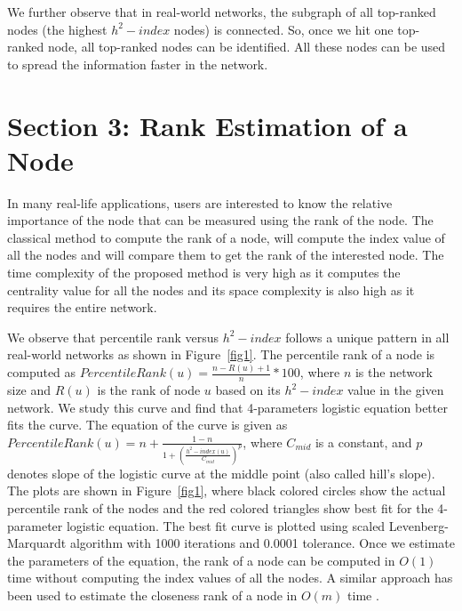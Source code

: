 \documentclass[12pt,3p]{article}
\begin{document}
We further observe that in real-world networks, the subgraph of all top-ranked nodes (the highest $h^2-index$ nodes) is connected. So, once we hit one top-ranked node, all top-ranked nodes can be identified. All these nodes can be used to spread the information faster in the network.

\section{Section 3: Rank Estimation of a Node}\label{sec3}

In many real-life applications, users are interested to know the relative importance of the node that can be measured using the rank of the node. The classical method to compute the rank of a node, will compute the index value of all the nodes and will compare them to get the rank of the interested node. The time complexity of the proposed method is very high as it computes the centrality value for all the nodes and its space complexity is also high as it requires the entire network. 


We observe that percentile rank versus $h^2-index$ follows a unique pattern in all real-world networks as shown in Figure~\ref{fig1}. The percentile rank of a node is computed as $PercentileRank(u)=\frac{n-R(u)+1}{n}*100$, where $n$ is the network size and $R(u)$ is the rank of node $u$ based on its $h^2-index$ value in the given network. We study this curve and find that 4-parameters logistic equation better fits the curve. The equation of the curve is given as $PercentileRank(u) = n + \frac{1-n}{1+\left( \frac{h^2-index(u)}{C_{mid}}\right) ^p}$, where $C_{mid}$ is a constant, and $p$ denotes slope of the logistic curve at the middle point (also called hill's slope). The plots are shown in Figure~\ref{fig1}, where black colored circles show the actual percentile rank of the nodes and the red colored triangles show best fit for the 4-parameter logistic equation. The best fit curve is plotted using scaled Levenberg-Marquardt algorithm \cite{more1978levenberg} with 1000 iterations and 0.0001 tolerance. Once we estimate the parameters of the equation, the rank of a node can be computed in $O(1)$ time without computing the index values of all the nodes. A similar approach has been used to estimate the closeness rank of a node in $O(m)$ time \cite{saxena2017afaster}.
\end{document}
